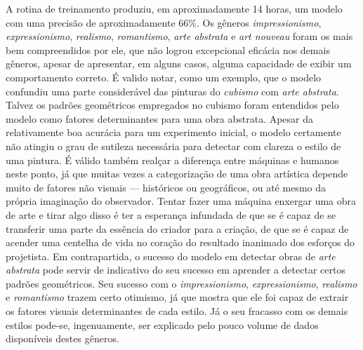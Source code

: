 \documentclass[12pt, a4paper]{article}
\begin{document}
A rotina de treinamento produziu, em aproximadamente 14 horas, um modelo com uma precisão de aproximadamente $66\%$. 
Os gêneros \emph{impressionismo}, \emph{expressionismo}, \emph{realismo},
\emph{romantismo}, \emph{arte abstrata} e \emph{art nouveau} foram os mais bem compreendidos por ele, que não logrou excepcional eficácia nos demais gêneros, apesar de apresentar, em alguns casos, alguma capacidade de exibir um comportamento correto. É valido notar, como um exemplo, que o modelo confundiu uma parte considerável das pinturas do \emph{cubismo} com \emph{arte abstrata}. Talvez os padrões geométricos empregados no cubismo foram entendidos pelo modelo como fatores determinantes para uma obra abstrata. Apesar da relativamente boa acurácia para um experimento inicial, o modelo certamente não atingiu o grau de sutileza necessária para detectar com clareza o estilo de uma pintura. É válido também realçar a diferença entre máquinas e humanos neste ponto, já que muitas vezes a categorização de uma obra artística depende muito de fatores não visuais --- históricos ou geográficos, ou até mesmo da própria imaginação do observador. Tentar fazer uma máquina enxergar uma obra de arte e tirar algo disso é ter a esperança infundada de que se é capaz de se transferir uma parte da essência do criador para a criação, de que se é capaz de acender uma centelha de vida no coração do resultado inanimado dos esforços do projetista. Em contrapartida, o sucesso do modelo em detectar obras de \emph{arte abstrata} pode servir de indicativo do seu sucesso em aprender a detectar certos padrões geométricos. Seu sucesso com o \emph{impressionismo}, \emph{expressionismo}, \emph{realismo} e \emph{romantismo} trazem certo otimismo, já que mostra que ele foi capaz de extrair os fatores visuais determinantes de cada estilo. Já o seu fracasso com os demais estilos pode-se, ingenuamente, ser explicado pelo pouco volume de dados disponíveis destes gêneros. 
\end{document}
